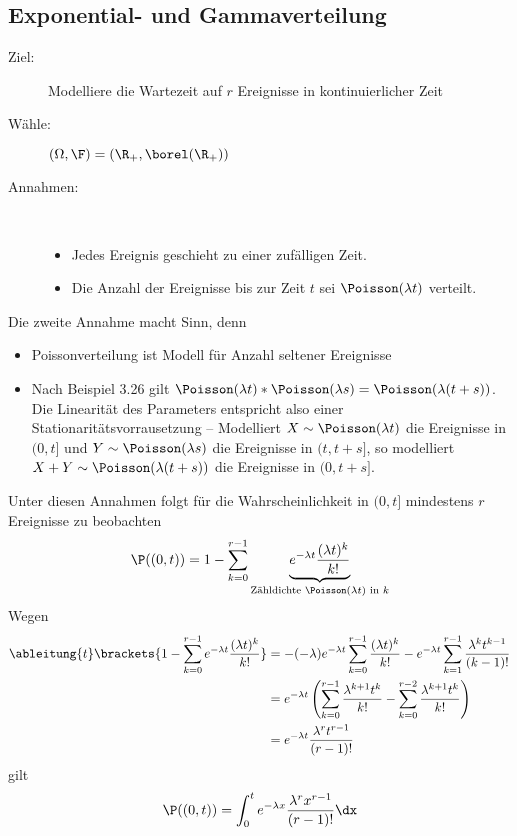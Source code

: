 \subsection{Exponential- und Gammaverteilung}

\begin{description}
	\item[Ziel:] Modelliere die Wartezeit auf $r$ Ereignisse in kontinuierlicher Zeit
	\item[Wähle:] $(\Omega, \F) = (\R_+, \borel(\R_+))$
	\item[Annahmen:] ~
	\begin{itemize}
		\item Jedes Ereignis geschieht zu einer zufälligen Zeit.
		\item Die Anzahl der Ereignisse bis zur Zeit $t$ sei $\Poisson(\lambda t)$ verteilt.
	\end{itemize}
\end{description}

Die zweite Annahme macht Sinn, denn
\begin{itemize}
	\item Poissonverteilung ist Modell für Anzahl seltener Ereignisse
	\item Nach Beispiel 3.26 gilt $\Poisson(\lambda t) \ast \Poisson(\lambda s) = \Poisson(\lambda(t+s))$. 
	Die Linearität des Parameters entspricht also einer Stationaritätsvorrausetzung -- Modelliert $X \sim \Poisson(\lambda t)$ die Ereignisse in $(0,t]$ und $Y \sim \Poisson(\lambda s)$ die Ereignisse in $(t,t+s]$, so modelliert $X+Y \sim \Poisson(\lambda (t+s))$ die Ereignisse in $(0,t+s]$.
\end{itemize}

Unter diesen Annahmen folgt für die Wahrscheinlichkeit in $(0,t]$ mindestens $r$ Ereignisse zu beobachten
\begin{equation*}
	\P ((0,t)) = 1-\sum_{k=0}^{r-1} \underbrace{e^{-\lambda t} \frac{(\lambda t)^k}{k!}}_{\text{Zähldichte } \Poisson(\lambda t)\text{ in } k}
\end{equation*}
Wegen
\begin{equation*}
\begin{aligned}
	\ableitung{t} \brackets{1- \sum_{k=0}^{r-1} e^{-\lambda t} \frac{(\lambda t)^k}{k!}}
	&= - (-\lambda) e^{-\lambda t} \sum_{k=0}^{r-1} \frac{(\lambda t)^k}{k!} - e^{-\lambda t} \sum_{k=1}^{r-1} \frac{\lambda^k t^{k-1}}{(k-1)!}  \\
	&= e^{-\lambda t} \left( \sum_{k=0}^{r-1} \frac{\lambda^{k+1} t^k}{k!} - \sum_{k=0}^{r-2} \frac{\lambda^{k+1} t^k}{k!} \right) \\
	&= e^{-\lambda t} \frac{\lambda^r t^{r-1}}{(r-1)!} 
\end{aligned}
\end{equation*}
gilt
\begin{equation*}
	\P((0,t)) = \int_{0}^t e^{-\lambda x} \frac{\lambda^r x^{r-1}}{(r-1)!} \dx
\end{equation*}


